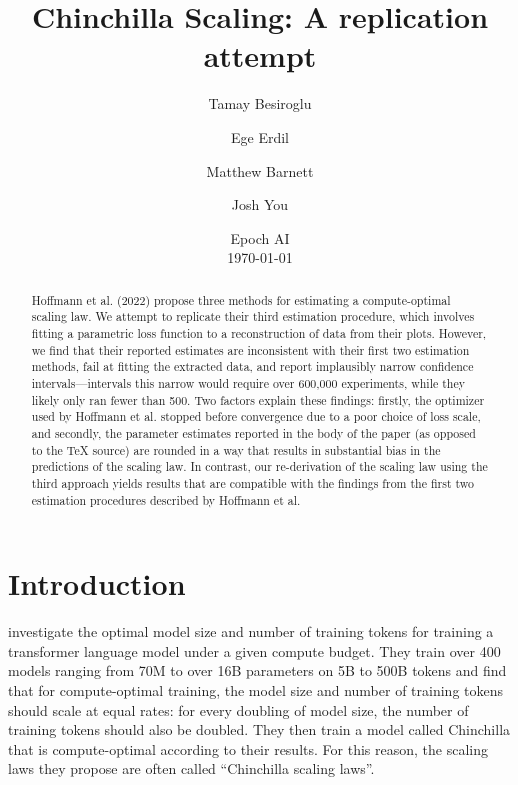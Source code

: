 \documentclass[twocolumn]{article}
\title{Chinchilla Scaling: A replication attempt}
\author{Tamay Besiroglu \and Ege Erdil  \and Matthew Barnett  \and Josh You}
\date{%
    \normalsize
    Epoch AI\\%
   \today
}
\begin{document}
\maketitle
\begin{abstract}
Hoffmann et al. (2022) propose three methods for estimating a compute-optimal scaling law. We attempt to replicate their third estimation procedure, which involves fitting a parametric loss function to a reconstruction of data from their plots. However, we find that their reported estimates are inconsistent with their first two estimation methods, fail at fitting the extracted data, and report implausibly narrow confidence intervals—intervals this narrow would require over 600,000 experiments, while they likely only ran fewer than 500. Two factors explain these findings: firstly, the optimizer used by Hoffmann et al. stopped before convergence due to a poor choice of loss scale, and secondly, the parameter estimates reported in the body of the paper (as opposed to the TeX source) are rounded in a way that results in substantial bias in the predictions of the scaling law. In contrast, our re-derivation of the scaling law using the third approach yields results that are compatible with the findings from the first two estimation procedures described by Hoffmann et al.\let\thefootnote\relax{}
\let\thefootnote\relax{}
\end{abstract}


\section{Introduction}

\cite{hoffmann2022training} investigate the optimal model size and number of training tokens for training a transformer language model under a given compute budget. They train over 400 models ranging from 70M to over 16B parameters on 5B to 500B tokens and find that for compute-optimal training, the model size and number of training tokens should scale at equal rates: for every doubling of model size, the number of training tokens should also be doubled. They then train a model called Chinchilla that is compute-optimal according to their results. For this reason, the scaling laws they propose are often called ``Chinchilla scaling laws''.
\end{document}
